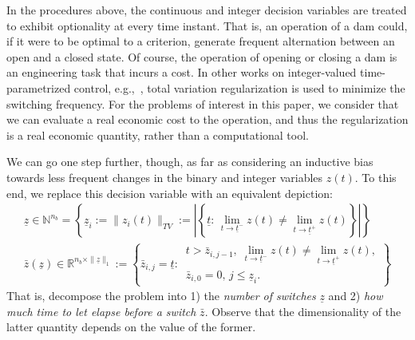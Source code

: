 \documentclass{article}
\newcommand{\1}{\mathds{1}}          %
\theoremstyle{definition}
\begin{document}
\begin{sloppypar}
In the procedures above, the continuous and integer decision variables are treated to exhibit optionality at every time instant. That is, an operation of a dam could, if it were to be optimal to a criterion, generate frequent alternation between an open and a closed state. Of course, the operation of opening or closing a dam is an engineering task that incurs a cost. In other works on integer-valued time-parametrized control, e.g.,~\cite{leyffer2022sequential}, total variation regularization is used to minimize the switching frequency. For the problems of interest in this paper, we consider that we can evaluate a real economic cost to the operation, and thus the regularization is a real economic quantity, rather than a computational tool. 

We can go one step further, though, as far as considering an inductive bias towards less frequent changes in the binary and integer variables $z(t)$. To this end, we replace this decision variable with an equivalent depiction:
\begin{equation}\label{eq:depictint}
\begin{array}{l}
\underline{z}\in \mathbb{N}^{n_b}
= \left\{\underline{z}_i := \|z_i(t)\|_{TV}
:= \left\vert 
\left\{\underline{t}:\,
\lim\limits_{t\to \underline{t}^-} z(t)\neq 
\lim\limits_{t\to \underline{t}^+} z(t)
\right\}
\right\vert \right\} \\[0.5em]
\bar{z}(\underline{z}) \in \mathbb{R}^{n_b\times \|\underline{z}\|_1}
:= \left\{\bar{z}_{i,j}=\underline{t}:\,
\begin{array}{l}
t>\bar{z}_{i,j-1},\;
\lim\limits_{t\to \underline{t}^-} z(t)\neq 
\lim\limits_{t\to \underline{t}^+} z(t), \\
\bar{z}_{i,0}=0,\, j\le \underline{z}_i.
\end{array}
\right\}
\end{array}
\end{equation}
That is, decompose the problem into 1) the \emph{number of switches} $\underline{z}$ and 2) \emph{how much time to let elapse before a switch} $\bar{z}$. Observe that the dimensionality of the latter quantity depends on the value of the former.


\end{sloppypar}
\end{document}
